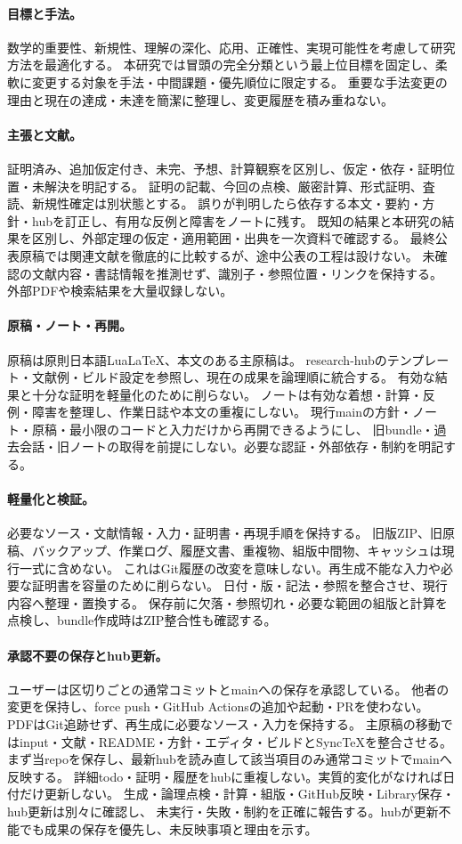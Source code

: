 \documentclass[11pt,a4paper]{ltjsarticle}
\begin{document}
\paragraph{目標と手法。}
数学的重要性、新規性、理解の深化、応用、正確性、実現可能性を考慮して研究方法を最適化する。
本研究では冒頭の完全分類という最上位目標を固定し、柔軟に変更する対象を手法・中間課題・優先順位に限定する。
重要な手法変更の理由と現在の達成・未達を簡潔に整理し、変更履歴を積み重ねない。

\paragraph{主張と文献。}
証明済み、追加仮定付き、未完、予想、計算観察を区別し、仮定・依存・証明位置・未解決を明記する。
証明の記載、今回の点検、厳密計算、形式証明、査読、新規性確定は別状態とする。
誤りが判明したら依存する本文・要約・方針・hubを訂正し、有用な反例と障害をノートに残す。
既知の結果と本研究の結果を区別し、外部定理の仮定・適用範囲・出典を一次資料で確認する。
最終公表原稿では関連文献を徹底的に比較するが、途中公表の工程は設けない。
未確認の文献内容・書誌情報を推測せず、識別子・参照位置・リンクを保持する。
外部PDFや検索結果を大量収録しない。

\paragraph{原稿・ノート・再開。}
原稿は原則日本語LuaLaTeX、本文のある主原稿は。
research-hubのテンプレート・文献例・ビルド設定を参照し、現在の成果を論理順に統合する。
有効な結果と十分な証明を軽量化のために削らない。
ノートは有効な着想・計算・反例・障害を整理し、作業日誌や本文の重複にしない。
現行mainの方針・ノート・原稿・最小限のコードと入力だけから再開できるようにし、
旧bundle・過去会話・旧ノートの取得を前提にしない。必要な認証・外部依存・制約を明記する。

\paragraph{軽量化と検証。}
必要なソース・文献情報・入力・証明書・再現手順を保持する。
旧版ZIP、旧原稿、バックアップ、作業ログ、履歴文書、重複物、組版中間物、キャッシュは現行一式に含めない。
これはGit履歴の改変を意味しない。再生成不能な入力や必要な証明書を容量のために削らない。
日付・版・記法・参照を整合させ、現行内容へ整理・置換する。
保存前に欠落・参照切れ・必要な範囲の組版と計算を点検し、bundle作成時はZIP整合性も確認する。

\paragraph{承認不要の保存とhub更新。}
ユーザーは区切りごとの通常コミットとmainへの保存を承認している。
他者の変更を保持し、force push・GitHub Actionsの追加や起動・PRを使わない。
PDFはGit追跡せず、再生成に必要なソース・入力を保持する。
主原稿の移動ではinput・文献・README・方針・エディタ・ビルドとSyncTeXを整合させる。
まず当repoを保存し、最新hubを読み直して該当項目のみ通常コミットでmainへ反映する。
詳細todo・証明・履歴をhubに重複しない。実質的変化がなければ日付だけ更新しない。
生成・論理点検・計算・組版・GitHub反映・Library保存・hub更新は別々に確認し、
未実行・失敗・制約を正確に報告する。hubが更新不能でも成果の保存を優先し、未反映事項と理由を示す。
\end{document}
